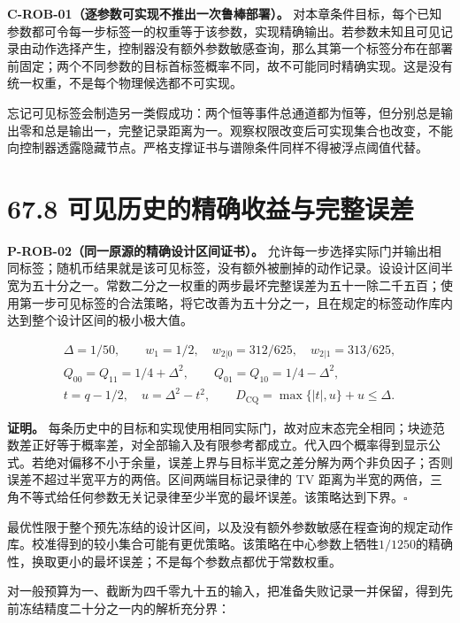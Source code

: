 \documentclass[
  11pt,
  oneside]{book}
\begin{document}
\protect\hypertarget{c-rob-01}{}{}

\textbf{C-ROB-01（逐参数可实现不推出一次鲁棒部署）。}
对本章条件目标，每个已知参数都可令每一步标签一的权重等于该参数，实现精确输出。若参数未知且可见记录由动作选择产生，控制器没有额外参数敏感查询，那么其第一个标签分布在部署前固定；两个不同参数的目标首标签概率不同，故不可能同时精确实现。这是没有统一权重，不是每个物理候选都不可实现。

忘记可见标签会制造另一类假成功：两个恒等事件总通道都为恒等，但分别总是输出零和总是输出一，完整记录距离为一。观察权限改变后可实现集合也改变，不能向控制器透露隐藏节点。严格支撑证书与谱隙条件同样不得被浮点阈值代替。

\section{67.8 可见历史的精确收益与完整误差}

\protect\hypertarget{p-rob-02}{}{}

\textbf{P-ROB-02（同一原源的精确设计区间证书）。}
允许每一步选择实际门并输出相同标签；随机币结果就是该可见标签，没有额外被删掉的动作记录。设设计区间半宽为五十分之一。常数二分之一权重的两步最坏完整误差为五十一除二千五百；使用第一步可见标签的合法策略，将它改善为五十分之一，且在规定的标签动作库内达到整个设计区间的极小极大值。

\[
\begin{gathered}
\Delta=1/50,\qquad
w_1=1/2,\quad w_{2|0}=312/625,\quad w_{2|1}=313/625,\\
Q_{00}=Q_{11}=1/4+\Delta^2,\qquad
Q_{01}=Q_{10}=1/4-\Delta^2,\\
t=q-1/2,\quad u=\Delta^2-t^2,\qquad
D_{\mathrm{CQ}}=\max\{|t|,u\}+u\le\Delta.
\end{gathered}
\]

\textbf{证明。}
每条历史中的目标和实现使用相同实际门，故对应末态完全相同；块迹范数差正好等于概率差，对全部输入及有限参考都成立。代入四个概率得到显示公式。若绝对偏移不小于余量，误差上界与目标半宽之差分解为两个非负因子；否则误差不超过半宽平方的两倍。区间两端目标记录律的
TV
距离为半宽的两倍，三角不等式给任何参数无关记录律至少半宽的最坏误差。该策略达到下界。\(\square\)

最优性限于整个预先冻结的设计区间，以及没有额外参数敏感在程查询的规定动作库。校准得到的较小集合可能有更优策略。该策略在中心参数上牺牲\(1/1250\)的精确性，换取更小的最坏误差；不是每个参数点都优于常数权重。

对一般预算为一、截断为四千零九十五的输入，把准备失败记录一并保留，得到先前冻结精度二十分之一内的解析充分界：
\end{document}
